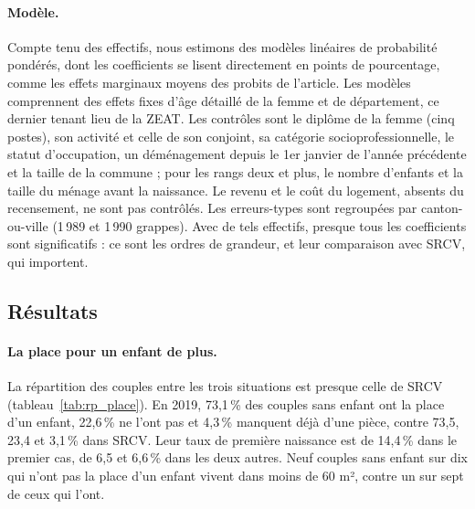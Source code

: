 \documentclass[11pt,a4paper]{article}
\theoremstyle{plain}
\theoremstyle{definition}
\theoremstyle{remark}
\begin{document}
\paragraph{Modèle.} Compte tenu des effectifs, nous estimons des modèles linéaires de probabilité pondérés, dont les coefficients se lisent directement en points de pourcentage, comme les effets marginaux moyens des probits de l'article. Les modèles comprennent des effets fixes d'âge détaillé de la femme et de département, ce dernier tenant lieu de la ZEAT. Les contrôles sont le diplôme de la femme (cinq postes), son activité et celle de son conjoint, sa catégorie socioprofessionnelle, le statut d'occupation, un déménagement depuis le 1er janvier de l'année précédente et la taille de la commune ; pour les rangs deux et plus, le nombre d'enfants et la taille du ménage avant la naissance. Le revenu et le coût du logement, absents du recensement, ne sont pas contrôlés. Les erreurs-types sont regroupées par canton-ou-ville (1\,989 et 1\,990 grappes). Avec de tels effectifs, presque tous les coefficients sont significatifs : ce sont les ordres de grandeur, et leur comparaison avec SRCV, qui importent.

\subsection*{Résultats}

\paragraph{La place pour un enfant de plus.} La répartition des couples entre les trois situations est presque celle de SRCV (tableau~\ref{tab:rp_place}). En 2019, 73,1\,\% des couples sans enfant ont la place d'un enfant, 22,6\,\% ne l'ont pas et 4,3\,\% manquent déjà d'une pièce, contre 73,5, 23,4 et 3,1\,\% dans SRCV. Leur taux de première naissance est de 14,4\,\% dans le premier cas, de 6,5 et 6,6\,\% dans les deux autres. Neuf couples sans enfant sur dix qui n'ont pas la place d'un enfant vivent dans moins de 60 m², contre un sur sept de ceux qui l'ont.
\end{document}
